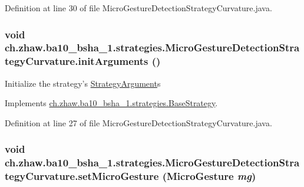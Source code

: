 Definition at line 30 of file MicroGestureDetectionStrategyCurvature.java.\hypertarget{classch_1_1zhaw_1_1ba10__bsha__1_1_1strategies_1_1MicroGestureDetectionStrategyCurvature_afc93fdc088cd9449668b5e277bf5c8f6}{
\subsubsection[{initArguments}]{\setlength{\rightskip}{0pt plus 5cm}void ch.zhaw.ba10\_\-bsha\_\-1.strategies.MicroGestureDetectionStrategyCurvature.initArguments ()}}
\label{classch_1_1zhaw_1_1ba10__bsha__1_1_1strategies_1_1MicroGestureDetectionStrategyCurvature_afc93fdc088cd9449668b5e277bf5c8f6}
Initialize the strategy's \hyperlink{classch_1_1zhaw_1_1ba10__bsha__1_1_1StrategyArgument}{StrategyArgument}s 

Implements \hyperlink{classch_1_1zhaw_1_1ba10__bsha__1_1_1strategies_1_1BaseStrategy_a0496e8fd0099a5f0f7765322d7e752a9}{ch.zhaw.ba10\_\-bsha\_\-1.strategies.BaseStrategy}.

Definition at line 27 of file MicroGestureDetectionStrategyCurvature.java.\hypertarget{classch_1_1zhaw_1_1ba10__bsha__1_1_1strategies_1_1MicroGestureDetectionStrategyCurvature_a8e53337041e648e2e5f9c72cc74d7a0e}{
\subsubsection[{setMicroGesture}]{\setlength{\rightskip}{0pt plus 5cm}void ch.zhaw.ba10\_\-bsha\_\-1.strategies.MicroGestureDetectionStrategyCurvature.setMicroGesture ({\bf MicroGesture} {\em mg})}}
\label{classch_1_1zhaw_1_1ba10__bsha__1_1_1strategies_1_1MicroGestureDetectionStrategyCurvature_a8e53337041e648e2e5f9c72cc74d7a0e}


